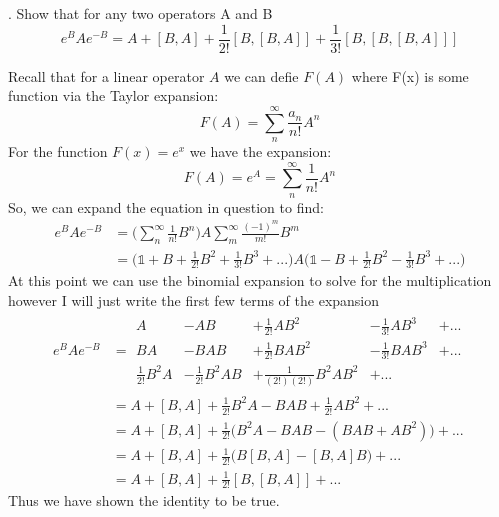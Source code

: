 \documentclass[a4paper, 11pt]{article}
\newenvironment{solution}{%
	\begin{list}{}{%
			\setlength{\topsep}{0pt}%
			\setlength{\leftmargin}{1.5cm}%
			\setlength{\rightmargin}{1.5cm}%
			\setlength{\listparindent}{\parindent}%
			\setlength{\itemindent}{\parindent}%
			\setlength{\parsep}{\parskip}%
	}%
	\item[]}{\end{list}}
\begin{document}
. Show that for any two operators A and B
	\begin{equation*}
		e^BAe^{-B} = A + [B,A] + \frac{1}{2!}[B,[B,A]]+\frac{1}{3!}[B,[B,[B,A]]]
	\end{equation*}
	
	\begin{solution}
		\noindent Recall that for a linear operator $A$ we can defie $F(A)$ where F(x) is some function via the Taylor expansion:
			\begin{equation*}
				F(A) = \sum_n^\infty \frac{a_n}{n!}A^n 
			\end{equation*}
		For the function $F(x) = e^x$ we have the expansion: 
			\begin{equation*}
				F(A) = e^A = \sum_n^\infty \frac{1}{n!}A^n 
			\end{equation*}
		So, we can expand the equation in question to find: 
			\begin{align*}
				e^BAe^{-B} &= \Big(\sum_n^\infty \frac{1}{n!}B^n\Big)A\sum_m^\infty \frac{(-1)^m}{m!}B^m \\ 
					&= \Big(\mathbb{1} + B + \frac{1}{2!} B^2 + \frac{1}{3!}B^3 + ... \Big)A\Big(\mathbb{1} - B + \frac{1}{2!} B^2 - \frac{1}{3!}B^3 + ... \Big)
			\end{align*}
		At this point we can use the binomial expansion to solve for the multiplication however I will just write the first few terms of the expansion
			\begin{align*}
				e^BAe^{-B} &= \begin{matrix}
					A & -AB &+\frac{1}{2!}AB^2 &-\frac{1}{3!}AB^3 & +... \\ 
					BA &-BAB &+\frac{1}{2!}BAB^2 &-\frac{1}{3!}BAB^3 &+... \\ 
					\frac{1}{2!}B^2A &-\frac{1}{2!}B^2AB &+\frac{1}{(2!)(2!)}B^2AB^2 &+... 
				\end{matrix} \\ 
				&= A + [B, A] + \frac{1}{2!}B^2A - BAB + \frac{1}{2!}AB^2 + ... \\ 
				&= A + [B,A] + \frac{1}{2!}\Big(B^2A-BAB-(BAB+AB^2)\Big) + ... \\ 
				&= A + [B,A] + \frac{1}{2!}\Big(B[B,A]-[B,A]B\Big) + ... \\
				&= A + [B,A] + \frac{1}{2!}[B, [B,A]] + ... 
			\end{align*}
		Thus we have shown the identity to be true. 
	\end{solution}
\end{document}
